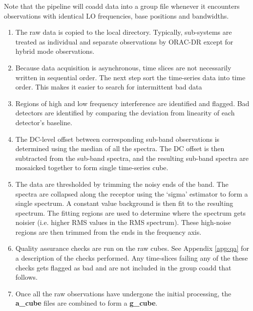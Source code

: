 \documentclass[11pt,oneside,chapters]{starlink}
\begin{document}
Note that the pipeline will coadd data into a group file whenever it
encounters observations with identical LO frequencies, base positions
and bandwidths.

\begin{enumerate}[label=(\textbf{\arabic*})]

\item The raw data is copied to the local directory. Typically,
sub-systems are treated as individual and separate observations by
ORAC-DR except for hybrid mode observations.

\item Because data acquisition is asynchronous, time slices are not
necessarily written in sequential order. The next step sort the
time-series data into time order. This makes it easier to search for
intermittent bad data

\item Regions of high and low frequency interference are identified
and flagged. Bad detectors are identified by comparing the deviation
from linearity of each detector's baseline.

\item The DC-level offset between corresponding sub-band observations
is determined using the median of all the spectra.  The DC offset is
then subtracted from the sub-band spectra, and the resulting sub-band
spectra are mosaicked together to form single time-series cube.

\item The data are thresholded by trimming the noisy ends of the band.
The spectra are collapsed along the receptor using the `sigma'
estimator to form a single spectrum. A constant value background is
then fit to the resulting spectrum. The fitting regions are used to
determine where the spectrum gets noisier (i.e. higher RMS values in
the RMS spectrum). These high-noise regions are then trimmed from the
ends in the frequency axis. %

\item Quality assurance checks are run on the raw cubes. See Appendix
\ref{app:qa} for a description of the checks performed. Any
time-slices failing any of the these checks gets flagged as bad and
are not included in the group coadd that follows.

\item Once all the raw observations have undergone the initial
processing, the \textbf{a\_cube} files are combined to form a
\textbf{g\_cube}.


\end{enumerate}
\end{document}
